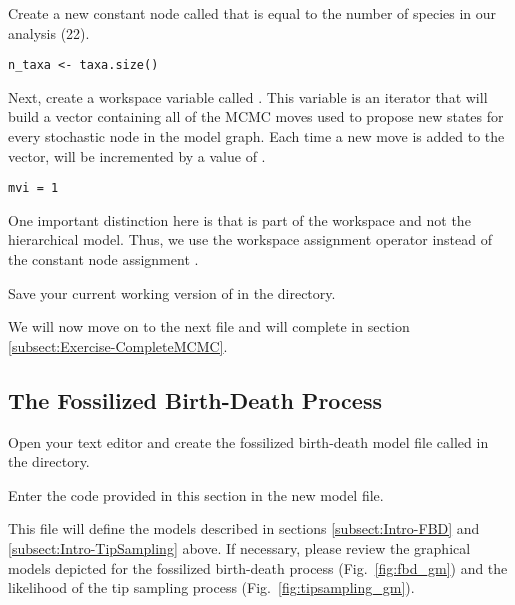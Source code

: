 Create a new constant node called  that is equal to the number of species in our analysis (22). 
{\tt \begin{snugshade*}
\begin{lstlisting}
n_taxa <- taxa.size() 
\end{lstlisting}
\end{snugshade*}}

Next, create a workspace variable called . 
This variable is an iterator that will build a vector containing all of the MCMC moves used to propose new states for every stochastic node in the model graph. 
Each time a new move is added to the vector,  will be incremented by a value of .
{\tt \begin{snugshade*}
\begin{lstlisting}
mvi = 1
\end{lstlisting}
\end{snugshade*}}
One important distinction here is that  is part of the \RevBayes workspace and not the hierarchical model. 
Thus, we use the workspace assignment operator \cl{=} instead of the constant node assignment \cl{<-}. 

{\begin{framed}
Save your current working version of  in the  directory.

We will now move on to the next \Rev file and will complete  in section \ref{subsect:Exercise-CompleteMCMC}.
\end{framed}}


\bigskip
\subsection{The Fossilized Birth-Death Process}\label{subsect:Exercise-ModelFBD}

{\begin{framed}
Open your text editor and create the fossilized birth-death model file called {\textcolor{red}{}} in the  directory.

Enter the \Rev code provided in this section in the new model file.
\end{framed}}

This file will define the models described in sections \ref{subsect:Intro-FBD} and \ref{subsect:Intro-TipSampling} above.
If necessary, please review the graphical models depicted for the fossilized birth-death process (Fig.\ \ref{fig:fbd_gm}) and the likelihood of the tip sampling process (Fig.\ \ref{fig:tipsampling_gm}).

